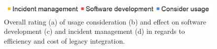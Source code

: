 \documentclass[../main.tex]{subfiles}
\begin{document}
    \begin{figure}[h]
        \centering
        \includegraphics[width=.7\linewidth]{img/res-assess-label.png}
        \hfill
        \captionsetup{justification=centering}
        \caption{
            Overall rating (a) of usage consideration (b) and effect on software development (c) and incident management (d) in regards to efficiency and cost of legacy integration.
        }
        \label{fig:res_assess_legacy}
    \end{figure}
\end{document}
